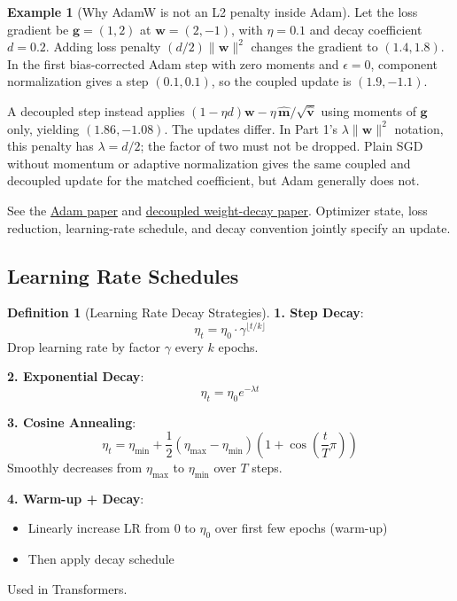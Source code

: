 \documentclass[11pt,twoside]{article}
\numberwithin{equation}{section}
\newcommand{\vect}[1]{\bm{#1}}
\theoremstyle{plain}
\theoremstyle{definition}
\newtheorem{definition}[theorem]{Definition}
\newtheorem{example}[theorem]{Example}
\theoremstyle{remark}
\begin{document}
\begin{example}[Why AdamW is not an L2 penalty inside Adam]
Let the loss gradient be $\vect g=(1,2)$ at $\vect w=(2,-1)$, with $\eta=0.1$ and decay coefficient $d=0.2$. Adding loss penalty $(d/2)\|\vect w\|^2$ changes the gradient to $(1.4,1.8)$. In the first bias-corrected Adam step with zero moments and $\epsilon=0$, component normalization gives a step $(0.1,0.1)$, so the coupled update is $(1.9,-1.1)$.

A decoupled step instead applies $(1-\eta d)\vect w-\eta\,\hat{\vect m}/\sqrt{\hat{\vect v}}$ using moments of $\vect g$ only, yielding $(1.86,-1.08)$. The updates differ. In Part 1's $\lambda\|\vect w\|^2$ notation, this penalty has $\lambda=d/2$; the factor of two must not be dropped. Plain SGD without momentum or adaptive normalization gives the same coupled and decoupled update for the matched coefficient, but Adam generally does not.
\end{example}
See the \href{https://arxiv.org/abs/1412.6980}{Adam paper} and \href{https://arxiv.org/abs/1711.05101}{decoupled weight-decay paper}. Optimizer state, loss reduction, learning-rate schedule, and decay convention jointly specify an update.

\subsection{Learning Rate Schedules}

\begin{definition}[Learning Rate Decay Strategies]

\textbf{1. Step Decay}:
\[
\eta_t = \eta_0 \cdot \gamma^{\lfloor t / k \rfloor}
\]
Drop learning rate by factor $\gamma$ every $k$ epochs.

\textbf{2. Exponential Decay}:
\[
\eta_t = \eta_0 e^{-\lambda t}
\]

\textbf{3. Cosine Annealing}:
\[
\eta_t = \eta_{\min} + \frac{1}{2}(\eta_{\max} - \eta_{\min})\left(1 + \cos\left(\frac{t}{T}\pi\right)\right)
\]
Smoothly decreases from $\eta_{\max}$ to $\eta_{\min}$ over $T$ steps.

\textbf{4. Warm-up + Decay}:
\begin{itemize}
\item Linearly increase LR from 0 to $\eta_0$ over first few epochs (warm-up)
\item Then apply decay schedule
\end{itemize}
Used in Transformers.
\end{definition}
\end{document}
